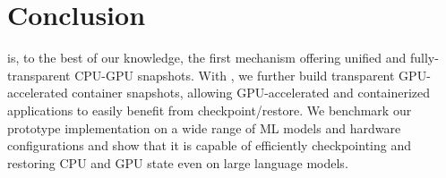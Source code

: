 \section{Conclusion}
\sys is, to the best of our knowledge, the first mechanism offering unified and fully-transparent CPU-GPU snapshots. With \sys, we further build transparent GPU-accelerated container snapshots, allowing GPU-accelerated and containerized applications to easily benefit from checkpoint/restore. We benchmark our prototype implementation on a wide range of ML models and hardware configurations and show that it is capable of efficiently checkpointing and restoring CPU and GPU state even on large language models.